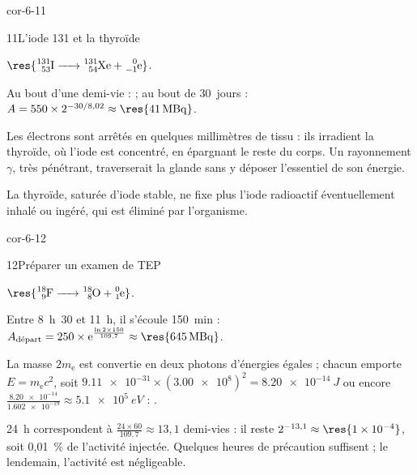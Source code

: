 \begin{blocLivre}{cor-6-11}
\begin{corrige}{11}{L'iode 131 et la thyroïde}
\begin{questions}
\item $\res{\ce{^{131}_{53}I -> ^{131}_{54}Xe + ^{0}_{-1}e}}$.
\item Au bout d'une demi-vie :  ; au bout de 30~jours :
$A=550\times2^{-30/8{,}02}\approx\res{\qty{41}{MBq}}$.
\item Les électrons sont arrêtés en quelques millimètres de tissu : ils irradient la thyroïde, où l'iode est
concentré, en épargnant le reste du corps. Un rayonnement $\gamma$, très pénétrant, traverserait la glande sans y
déposer l'essentiel de son énergie.
\item La thyroïde, saturée d'iode stable, ne fixe plus l'iode radioactif éventuellement inhalé ou ingéré, qui est
éliminé par l'organisme.
\end{questions}
\end{corrige}
\end{blocLivre}
\begin{blocLivre}{cor-6-12}
\begin{corrige}{12}{Préparer un examen de TEP}
\begin{questions}
\item $\res{\ce{^{18}_{9}F -> ^{18}_{8}O + ^{0}_{1}e}}$.
\item Entre 8~h~30 et 11~h, il s'écoule 150~min : $A_\text{départ}=250\times\mathrm{e}^{\frac{\ln2\times150}{109{,}7}}\approx\res{\qty{645}{MBq}}$.
\item La masse $2m_\mathrm{e}$ est convertie en deux photons d'énergies égales ; chacun emporte $E=m_\mathrm{e}c^2$, soit
$\num{9.11e-31}\times(\num{3.00e8})^2=\qty{8,20e-14}{J}$ ou encore $\frac{\num{8.20e-14}}{\num{1.602e-19}}\approx\qty{5,1e5}{eV}$ :
.
\item 24~h correspondent à $\frac{24\times60}{109{,}7}\approx13{,}1$ demi-vies : il reste $2^{-13{,}1}\approx\res{\num{1e-4}}$,
soit 0,01~\% de l'activité injectée. Quelques heures de précaution suffisent ; le lendemain, l'activité est négligeable.
\end{questions}
\end{corrige}
\end{blocLivre}
